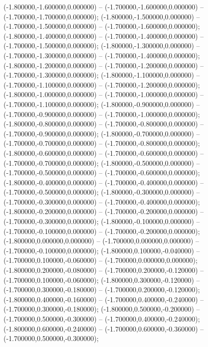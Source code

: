  (-1.800000,-1.600000,0.000000) -- (-1.700000,-1.600000,0.000000) -- (-1.700000,-1.700000,0.000000);
 (-1.800000,-1.500000,0.000000) -- (-1.700000,-1.500000,0.000000) -- (-1.700000,-1.600000,0.000000);
 (-1.800000,-1.400000,0.000000) -- (-1.700000,-1.400000,0.000000) -- (-1.700000,-1.500000,0.000000);
 (-1.800000,-1.300000,0.000000) -- (-1.700000,-1.300000,0.000000) -- (-1.700000,-1.400000,0.000000);
 (-1.800000,-1.200000,0.000000) -- (-1.700000,-1.200000,0.000000) -- (-1.700000,-1.300000,0.000000);
 (-1.800000,-1.100000,0.000000) -- (-1.700000,-1.100000,0.000000) -- (-1.700000,-1.200000,0.000000);
 (-1.800000,-1.000000,0.000000) -- (-1.700000,-1.000000,0.000000) -- (-1.700000,-1.100000,0.000000);
 (-1.800000,-0.900000,0.000000) -- (-1.700000,-0.900000,0.000000) -- (-1.700000,-1.000000,0.000000);
 (-1.800000,-0.800000,0.000000) -- (-1.700000,-0.800000,0.000000) -- (-1.700000,-0.900000,0.000000);
 (-1.800000,-0.700000,0.000000) -- (-1.700000,-0.700000,0.000000) -- (-1.700000,-0.800000,0.000000);
 (-1.800000,-0.600000,0.000000) -- (-1.700000,-0.600000,0.000000) -- (-1.700000,-0.700000,0.000000);
 (-1.800000,-0.500000,0.000000) -- (-1.700000,-0.500000,0.000000) -- (-1.700000,-0.600000,0.000000);
 (-1.800000,-0.400000,0.000000) -- (-1.700000,-0.400000,0.000000) -- (-1.700000,-0.500000,0.000000);
 (-1.800000,-0.300000,0.000000) -- (-1.700000,-0.300000,0.000000) -- (-1.700000,-0.400000,0.000000);
 (-1.800000,-0.200000,0.000000) -- (-1.700000,-0.200000,0.000000) -- (-1.700000,-0.300000,0.000000);
 (-1.800000,-0.100000,0.000000) -- (-1.700000,-0.100000,0.000000) -- (-1.700000,-0.200000,0.000000);
 (-1.800000,0.000000,0.000000) -- (-1.700000,0.000000,0.000000) -- (-1.700000,-0.100000,0.000000);
 (-1.800000,0.100000,-0.040000) -- (-1.700000,0.100000,-0.060000) -- (-1.700000,0.000000,0.000000);
 (-1.800000,0.200000,-0.080000) -- (-1.700000,0.200000,-0.120000) -- (-1.700000,0.100000,-0.060000);
 (-1.800000,0.300000,-0.120000) -- (-1.700000,0.300000,-0.180000) -- (-1.700000,0.200000,-0.120000);
 (-1.800000,0.400000,-0.160000) -- (-1.700000,0.400000,-0.240000) -- (-1.700000,0.300000,-0.180000);
 (-1.800000,0.500000,-0.200000) -- (-1.700000,0.500000,-0.300000) -- (-1.700000,0.400000,-0.240000);
 (-1.800000,0.600000,-0.240000) -- (-1.700000,0.600000,-0.360000) -- (-1.700000,0.500000,-0.300000);
